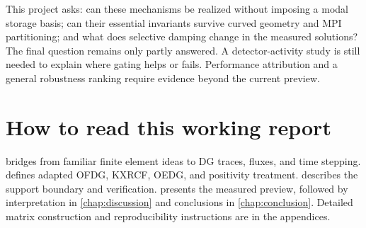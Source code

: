 This project asks: can these mechanisms be realized without imposing a modal
storage basis; can their essential invariants survive curved geometry and MPI
partitioning; and what does selective damping change in the measured solutions?
The final question remains only partly answered. A detector-activity study is
still needed to explain where gating helps or fails. Performance attribution
and a general robustness ranking require evidence beyond the current preview.

\section{How to read this working report}
 bridges from familiar finite element ideas to DG traces,
fluxes, and time stepping.  defines adapted OFDG,
KXRCF, OEDG, and positivity treatment.  describes
the support boundary and verification.  presents the
measured preview, followed by interpretation in \cref{chap:discussion} and
conclusions in \cref{chap:conclusion}. Detailed matrix construction and
reproducibility instructions are in the appendices.

